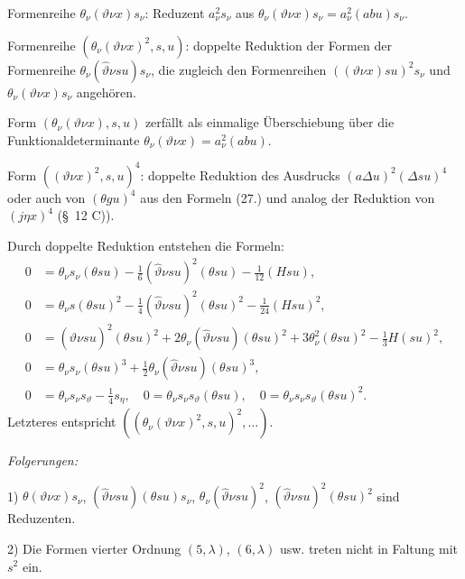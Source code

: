 \documentclass[11pt]{article}
\newcommand{\A}{\Delta}
\begin{document}
Formenreihe $\theta_\nu(\vartheta\nu x)s_\nu$: Reduzent $a_\nu^2s_\nu$ aus $\theta_\nu(\vartheta\nu x)s_\nu=a_\nu^2(abu)s_\nu$.

Formenreihe $(\theta_\nu(\vartheta\nu x)^2,s,u)$: doppelte Reduktion der Formen der Formenreihe $\theta_\nu(\widehat\vartheta\nu su)s_\nu$, die zugleich den Formenreihen $((\vartheta\nu x)su)^2s_\nu$ und $\theta_\nu(\vartheta\nu x)s_\nu$ angehören.

Form $(\theta_\nu(\vartheta\nu x),s,u)$ zerfällt als einmalige Überschiebung über die Funktionaldeterminante $\theta_\nu(\vartheta\nu x)=a_\nu^2(abu)$.

Form $((\vartheta\nu x)^2,s,u)^4$: doppelte Reduktion des Ausdrucks $(a\A u)^2(\A su)^4$ oder auch von $(\theta gu)^4$ aus den Formeln (27.) und analog der Reduktion von $(j\eta x)^4$ (\S\ 12 C)).

Durch doppelte Reduktion entstehen die Formeln:
\[
\tag{28}
\begin{aligned}
0&=\theta_\nu s_\nu(\theta su)-\frac16(\widehat\vartheta\nu su)^2(\theta su)-\frac1{12}(Hsu),\\
0&=\theta_\nu s(\theta su)^2-\frac14(\widehat\vartheta\nu su)^2(\theta su)^2-\frac1{24}(Hsu)^2,\\
0&=(\widehat\vartheta\nu su)^2(\theta su)^2+2\theta_\nu(\widehat\vartheta\nu su)(\theta su)^2
  +3\theta_\nu^2(\theta su)^2-\frac13H(su)^2,\\
0&=\theta_\nu s_\nu(\theta su)^3+\frac12\theta_\nu(\widehat\vartheta\nu su)(\theta su)^3,\\
0&=\theta_\nu s_\nu s_\vartheta-\frac14s_\eta,
\quad 0=\theta_\nu s_\nu s_\vartheta(\theta su),
\quad 0=\theta_\nu s_\nu s_\vartheta(\theta su)^2.
\end{aligned}
\]
Letzteres entspricht $((\theta_\nu(\vartheta\nu x)^2,s,u)^2,\ldots)$.

\noindent\emph{Folgerungen:}

1) $\theta(\vartheta\nu x)s_\nu$, $(\widehat\vartheta\nu su)(\theta su)s_\nu$, $\theta_\nu(\widehat\vartheta\nu su)^2$, $(\widehat\vartheta\nu su)^2(\theta su)^2$ sind Reduzenten.

2) Die Formen vierter Ordnung $(5,\lambda)$, $(6,\lambda)$ usw. treten nicht in Faltung mit $s^2$ ein.
\end{document}
